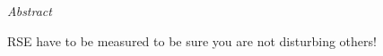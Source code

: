 

\newpage
\thispagestyle{empty}
\begin{center}
\Huge\emph{Abstract}
\end{center}
\medskip
\noindent

RSE have to be measured to be sure you are not disturbing others!

